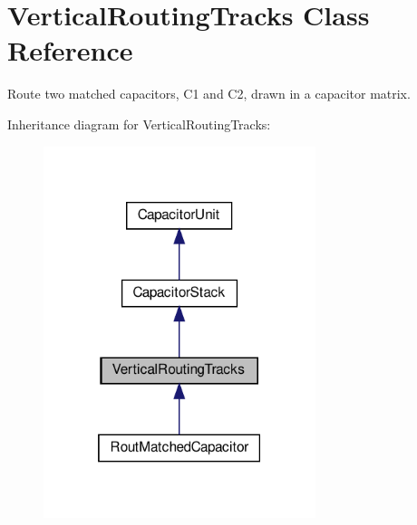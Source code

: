 \hypertarget{classpython_1_1capacitorvrtracks_1_1VerticalRoutingTracks}{}\section{Vertical\+Routing\+Tracks Class Reference}
\label{classpython_1_1capacitorvrtracks_1_1VerticalRoutingTracks}


Route two matched capacitors, C1 and C2, drawn in a capacitor matrix.  




Inheritance diagram for Vertical\+Routing\+Tracks\+:\nopagebreak
\begin{figure}[H]
\begin{center}
\leavevmode
\includegraphics[width=225pt]{classpython_1_1capacitorvrtracks_1_1VerticalRoutingTracks__inherit__graph}
\end{center}
\end{figure}
